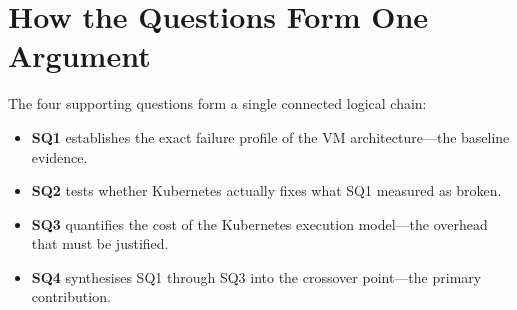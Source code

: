 \section{How the Questions Form One Argument}
\label{sec:question-chain}

The four supporting questions form a single connected logical chain:

\begin{itemize}
  \item \textbf{SQ1} establishes the exact failure profile of the VM architecture---the baseline evidence.
  \item \textbf{SQ2} tests whether Kubernetes actually fixes what SQ1 measured as broken.
  \item \textbf{SQ3} quantifies the cost of the Kubernetes execution model---the overhead that must be justified.
  \item \textbf{SQ4} synthesises SQ1 through SQ3 into the crossover point---the primary contribution.
\end{itemize}
